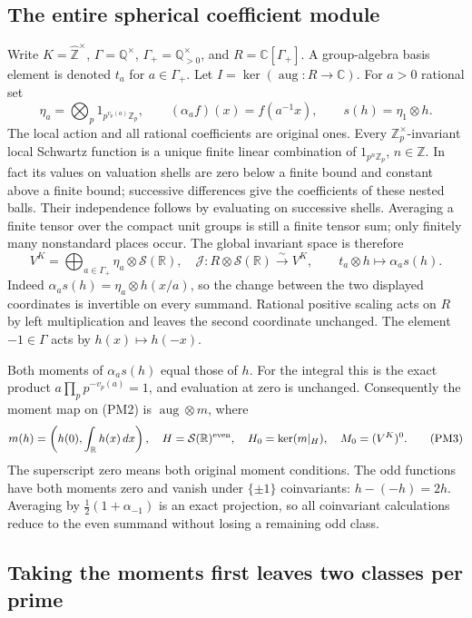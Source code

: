\documentclass[11pt,a4paper]{article}
\theoremstyle{definition}\newtheorem{definition}[theorem]{Definition}
\begin{document}
\subsection{The entire spherical coefficient module}

Write $K=\widehat{\mathbb Z}^{\times}$, $\Gamma=\mathbb Q^\times$,
$\Gamma_+=\mathbb Q_{>0}^{\times}$, and
$R=\mathbb C[\Gamma_+]$. A group-algebra basis element is denoted
$t_a$ for $a\in\Gamma_+$. Let $I=\ker(\operatorname{aug}:R\to\mathbb C)$.
For $a>0$ rational set
\[
 \eta_a=\bigotimes_p1_{p^{v_p(a)}\mathbb Z_p},\qquad
 (\alpha_a f)(x)=f(a^{-1}x),\qquad
 s(h)=\eta_1\otimes h.
 \tag{PM1}
\]
The local action and all rational coefficients are original ones.
Every $\mathbb Z_p^\times$-invariant local Schwartz function is
a unique finite linear combination of $1_{p^n\mathbb Z_p}$,
$n\in\mathbb Z$. In fact its values on valuation shells are
zero below a finite bound and constant above a finite bound;
successive differences give the coefficients of these nested
balls. Their independence follows by evaluating on successive
shells. Averaging a finite tensor over the compact unit groups
is still a finite tensor sum; only finitely many nonstandard
places occur. The global invariant space is therefore
\[
 V^K=\bigoplus_{a\in\Gamma_+}\eta_a\otimes\mathcal S(\mathbb R),
 \quad
 \mathcal J:R\otimes\mathcal S(\mathbb R)\xrightarrow{\sim}V^K,
 \qquad t_a\otimes h\longmapsto\alpha_a s(h).
 \tag{PM2}
\]
Indeed $\alpha_as(h)=\eta_a\otimes h(x/a)$, so the change
between the two displayed coordinates is invertible on every
summand. Rational positive scaling acts on $R$ by left
multiplication and leaves the second coordinate unchanged.
The element $-1\in\Gamma$ acts by $h(x)\mapsto h(-x)$.

Both moments of $\alpha_as(h)$ equal those of $h$. For the
integral this is the exact product $a\prod_p p^{-v_p(a)}=1$,
and evaluation at zero is unchanged. Consequently the moment
map on (PM2) is $\operatorname{aug}\otimes m$, where
\[
 m(h)=\left(h(0),\int_{\mathbb R}h(x)\,dx\right),\quad
 H=\mathcal S(\mathbb R)^{\rm even},\quad H_0=\ker(m|_H),
 \quad M_0=(V^K)^0.
 \tag{PM3}
\]
The superscript zero means both original moment conditions.
The odd functions have both moments zero and vanish under
$\{\pm1\}$ coinvariants: $h-(-h)=2h$. Averaging by
$\tfrac12(1+\alpha_{-1})$ is an exact projection, so all
coinvariant calculations reduce to the even summand without
losing a remaining odd class.

\subsection{Taking the moments first leaves two classes per prime}
\end{document}

